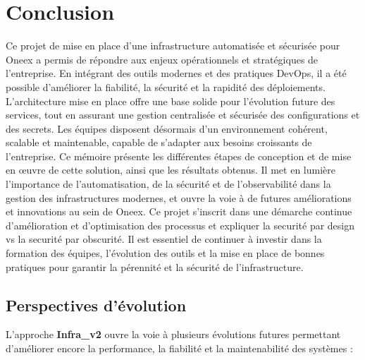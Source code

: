 \section{Conclusion}
Ce projet de mise en place d'une infrastructure automatisée et sécurisée pour Oneex a permis de répondre aux enjeux opérationnels et stratégiques de l'entreprise. En intégrant des outils modernes et des pratiques DevOps, il a été possible d'améliorer la fiabilité, la sécurité et la rapidité des déploiements.
L'architecture mise en place offre une base solide pour l'évolution future des services, tout en
assurant une gestion centralisée et sécurisée des configurations et des secrets. Les équipes disposent désormais d'un environnement cohérent, scalable et maintenable, capable de s'adapter aux besoins croissants de l'entreprise.
Ce mémoire présente les différentes étapes de conception et de mise en œuvre de cette solution, ainsi que
les résultats obtenus. Il met en lumière l'importance de l'automatisation, de la sécurité et de l'observabilité dans la gestion des infrastructures modernes, et ouvre la voie à de futures améliorations et innovations au sein de Oneex.
Ce projet s'inscrit dans une démarche continue d'amélioration et d'optimisation des processus
et expliquer la securité par design vs la securité par obscurité. Il est essentiel de continuer à investir dans la formation des équipes, l'évolution des outils et la mise en place de bonnes pratiques pour garantir la pérennité et la sécurité de l'infrastructure.
\subsection{Perspectives d'évolution}

L’approche \textbf{Infra\_v2} ouvre la voie à plusieurs évolutions futures permettant d’améliorer encore la performance, la fiabilité et la maintenabilité des systèmes :

